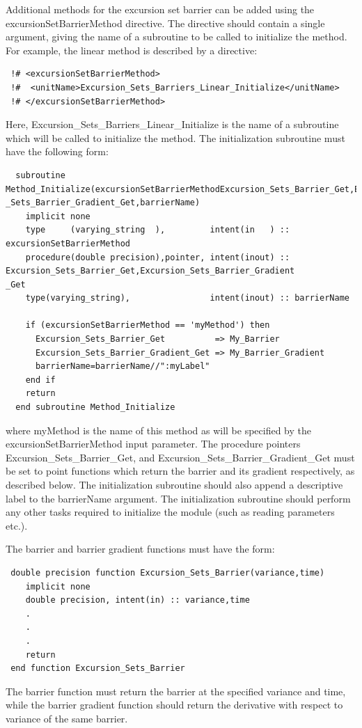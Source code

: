 Additional methods for the excursion set barrier can be added using the {\normalfont \ttfamily excursionSetBarrierMethod} directive. The directive should contain a single argument, giving the name of a subroutine to be called to initialize the method. For example, the {\normalfont \ttfamily linear} method is described by a directive:
\begin{verbatim}
 !# <excursionSetBarrierMethod>
 !#  <unitName>Excursion_Sets_Barriers_Linear_Initialize</unitName>
 !# </excursionSetBarrierMethod>
\end{verbatim}
Here, {\normalfont \ttfamily Excursion\_Sets\_Barriers\_Linear\_Initialize} is the name of a subroutine which will be called to initialize the method. The initialization subroutine must have the following form:
\begin{verbatim}
  subroutine Method_Initialize(excursionSetBarrierMethodExcursion_Sets_Barrier_Get,Excursion
_Sets_Barrier_Gradient_Get,barrierName)
    implicit none
    type     (varying_string  ),         intent(in   ) :: excursionSetBarrierMethod
    procedure(double precision),pointer, intent(inout) :: Excursion_Sets_Barrier_Get,Excursion_Sets_Barrier_Gradient
_Get
    type(varying_string),                intent(inout) :: barrierName

    if (excursionSetBarrierMethod == 'myMethod') then
      Excursion_Sets_Barrier_Get          => My_Barrier
      Excursion_Sets_Barrier_Gradient_Get => My_Barrier_Gradient
      barrierName=barrierName//":myLabel"
    end if
    return
  end subroutine Method_Initialize
\end{verbatim}
where {\normalfont \ttfamily myMethod} is the name of this method as will be specified by the {\normalfont \ttfamily excursionSetBarrierMethod} input parameter. The procedure pointers {\normalfont \ttfamily Excursion\_Sets\_Barrier\_Get}, and {\normalfont \ttfamily Excursion\_Sets\_Barrier\_Gradient\_Get} must be set to point functions which return the barrier and its gradient respectively, as described below. The initialization subroutine should also append a descriptive label to the {\normalfont \ttfamily barrierName} argument. The initialization subroutine should perform any other tasks required to initialize the module (such as reading parameters etc.).

The barrier and barrier gradient functions must have the form:
\begin{verbatim}
 double precision function Excursion_Sets_Barrier(variance,time)
    implicit none
    double precision, intent(in) :: variance,time
    .
    .
    .
    return
 end function Excursion_Sets_Barrier
\end{verbatim}
The barrier function must return the barrier at the specified {\normalfont \ttfamily variance} and {\normalfont \ttfamily time}, while the barrier gradient function should return the derivative with respect to variance of the same barrier.

